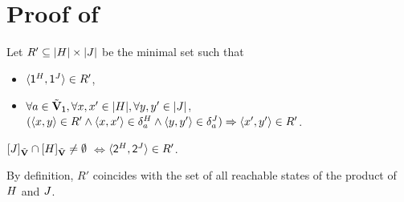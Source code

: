 \section{Proof of }\label{section: proposition: witness}
Let $R' \subseteq \domain{\graph[2]} \times \domain{\graph[3]}$ be the minimal set such that
\begin{itemize}
       \item $\tuple{\src^{\graph[2]}, \src^{\graph[3]}} \in R'$,
       \item $\forall a \in \tilde{\vsig}_{\id}, \forall x, x' \in \domain{\graph[2]}, \forall y, y' \in \domain{\graph[3]}$,\   $(\tuple{x, y} \in R' \land \tuple{x, x'} \in \delta_{a}^{\graph[2]} \land \tuple{y, y'} \in \delta_{a}^{\graph[3]}) \Rightarrow \tuple{x', y'} \in R'$.
\end{itemize}
\begin{claim}\label{claim: witness pre}
$\ljump{\graph[3]}_{\tilde{\vsig}} \cap \ljump{\graph[2]}_{\tilde{\vsig}} \neq \emptyset$ \quad$\Leftrightarrow$\quad  $\tuple{\tgt^{\graph[2]}, \tgt^{\graph[3]}} \in R'$.
\end{claim}
\begin{claimproof}
By definition, $R'$ coincides with the set of all reachable states of the product  of $\graph[2]$ and $\graph[3]$.
\end{claimproof}

